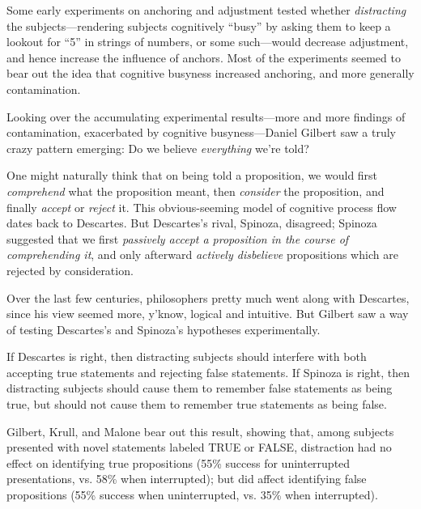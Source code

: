 \myendsectiontext


\bigskip


{
 Some early experiments on anchoring and adjustment tested whether
\textit{distracting} the subjects---rendering subjects cognitively
``busy'' by asking them to keep a
lookout for ``5'' in strings of
numbers, or some such---would decrease adjustment, and hence increase
the influence of anchors. Most of the experiments seemed to bear out
the idea that cognitive busyness increased anchoring, and more
generally contamination. }

{
 Looking over the accumulating experimental results---more and more
findings of contamination, exacerbated by cognitive busyness---Daniel
Gilbert saw a truly crazy pattern emerging: Do we believe
\textit{everything} we're told?}

{
 One might naturally think that on being told a proposition, we
would first \textit{comprehend} what the proposition meant, then
\textit{consider} the proposition, and finally \textit{accept} or
\textit{reject} it. This obvious-seeming model of cognitive process
flow dates back to Descartes. But Descartes's rival,
Spinoza, disagreed; Spinoza suggested that we first \textit{passively
accept a proposition in the course of comprehending it}, and only
afterward \textit{actively disbelieve} propositions which are rejected
by consideration.}

{
 Over the last few centuries, philosophers pretty much went along
with Descartes, since his view seemed more, y'know,
logical and intuitive. But Gilbert saw a way of testing
Descartes's and Spinoza's hypotheses
experimentally.}

{
 If Descartes is right, then distracting subjects should interfere
with both accepting true statements and rejecting false statements. If
Spinoza is right, then distracting subjects should cause them to
remember false statements as being true, but should not cause them to
remember true statements as being false.}

{
 Gilbert, Krull, and Malone bear out this result, showing that,
among subjects presented with novel statements labeled TRUE or FALSE,
distraction had no effect on identifying true propositions (55\%
success for uninterrupted presentations, vs. 58\% when interrupted);
but did affect identifying false propositions (55\% success when
uninterrupted, vs. 35\% when interrupted).}

